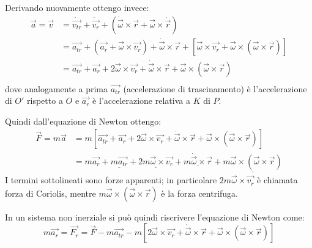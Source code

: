 \documentclass[../main.tex]{subfiles}
\begin{document}
Derivando nuovamente ottengo invece:
\begin{equation}\label{AccNonInerziale}
\begin{split}
	\vec{a}=\vec{v}	& =\dot{\overrightarrow{v_{tr}}}+\dot{\vec{v_r}}+\left(\dot{\vec{\omega}}\times\vec{r}+\vec{\omega}\times\dot{\vec{r}}\right)\\
											& =\overrightarrow{a_{tr}}+\left(\vec{a_r}+\vec{\omega}\times\vec{v_r}\right)+\dot{\vec{\omega}}\times\vec{r}+\left[\vec{\omega}\times\vec{v_r}+\vec{\omega}\times(\vec{\omega}\times\vec{r})\right]\\
											& =\overrightarrow{a_{tr}}+\vec{a_r}+2\vec{\omega}\times\vec{v_r}+\dot{\vec{\omega}}\times\vec{r}+\vec{\omega}\times(\vec{\omega}\times\vec{r})\\
\end{split}
\end{equation}
dove analogamente a prima $\overrightarrow{a_{tr}}$ (accelerazione di trascinamento) è l'accelerazione di $O'$ rispetto a $O$ e $\overrightarrow{a_r}$ è l'accelerazione relativa a $K$ di $P$.

Quindi dall'equazione di Newton ottengo:
\begin{equation*}
\begin{split}
	\vec{F}=m\vec{a}	& =m\left[\overrightarrow{a_{tr}}+\vec{a_r}+2\vec{\omega}\times\vec{v_r}+\dot{\vec{\omega}}\times\vec{r}+\vec{\omega}\times(\vec{\omega}\times\vec{r})\right]\\
											& =m\vec{a_r}+\underline{m\overrightarrow{a_{tr}}}+\underline{2m\vec{\omega}\times\vec{v_r}}+\underline{m\dot{\vec{\omega}}\times\vec{r}}+\underline{m\vec{\omega}\times(\vec{\omega}\times\vec{r})}
\end{split}
\end{equation*}
I termini sottolineati sono forze apparenti; in particolare $2m\vec{\omega}\times\vec{v_r}$
è chiamata forza di Coriolis, mentre $m\vec{\omega}\times(\vec{\omega}\times\vec{r})$
è la forza centrifuga.

In un sistema non inerziale si può quindi riscrivere l'equazione di Newton come:
\begin{equation}\label{ForzaNonInerziale}
	m\vec{a_r}=\vec{F_r}=\vec{F}-m\overrightarrow{a_{tr}}-m\left[2\vec{\omega}\times\vec{v_r}+\dot{\vec{\omega}}\times\vec{r}+\vec{\omega}\times(\vec{\omega}\times\vec{r})\right]
\end{equation}
\end{document}
